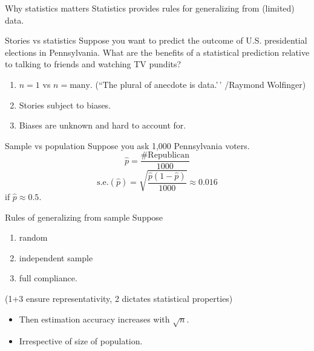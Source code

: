 \documentclass[
  ignorenonframetext,
  aspectratio=54,
]{beamer}
\providecommand{\tightlist}{%
  \setlength{\itemsep}{0pt}\setlength{\parskip}{0pt}}
\begin{document}
\begin{frame}{Why statistics matters}
\protect\hypertarget{why-statistics-matters}{}
Statistics provides rules for generalizing from (limited) data.
\end{frame}

\begin{frame}{Stories vs statistics}
\protect\hypertarget{stories-vs-statistics}{}
Suppose you want to predict the outcome of U.S. presidential elections
in Pennsylvania. What are the benefits of a statistical prediction
relative to talking to friends and watching TV pundits?

\begin{enumerate}
\tightlist
\item
  \(n=1\) vs \(n=\text{many}\). (``The plural of anecdote is data.'\,'
  /Raymond Wolfinger)
\item
  Stories subject to biases.
\item
  Biases are unknown and hard to account for.
\end{enumerate}
\end{frame}

\begin{frame}{Sample vs population}
\protect\hypertarget{sample-vs-population}{}
Suppose you ask 1,000 Pennsylvania voters. \[
\hat p = \frac {\# \text{Republican}}{1000}
\] \[
\text{s.e.}(\hat p) = \sqrt{\frac {\hat p (1-\hat p)}{1000}} \approx 0.016
\] if \(\hat p\approx 0.5\).
\end{frame}

\begin{frame}{Rules of generalizing from sample}
\protect\hypertarget{rules-of-generalizing-from-sample}{}
Suppose

\begin{enumerate}
\tightlist
\item
  random
\item
  independent sample
\item
  full compliance.
\end{enumerate}

(1+3 ensure representativity, 2 dictates statistical properties)

\begin{itemize}
\tightlist
\item
  Then estimation accuracy increases with \(\sqrt{n}\).
\item
  Irrespective of size of population.
\end{itemize}
\end{frame}
\end{document}

